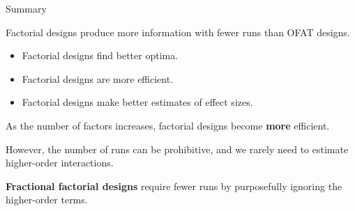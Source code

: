 \documentclass[10pt]{beamer}
\begin{document}
\begin{frame}{Summary}

Factorial designs produce more information with fewer runs than OFAT designs.
\begin{itemize}
\item Factorial designs find better optima.
\item Factorial designs are more efficient.
\item Factorial designs make better estimates of effect sizes.
\end{itemize}

\pause
\medskip
As the number of factors increases, factorial designs become \textbf{more} efficient.

\medskip
However, the number of runs can be prohibitive, and we rarely need to estimate higher-order interactions.

\pause
\medskip
\textbf{Fractional factorial designs} require fewer runs by purposefully ignoring the higher-order terms.

\end{frame}
\end{document}
